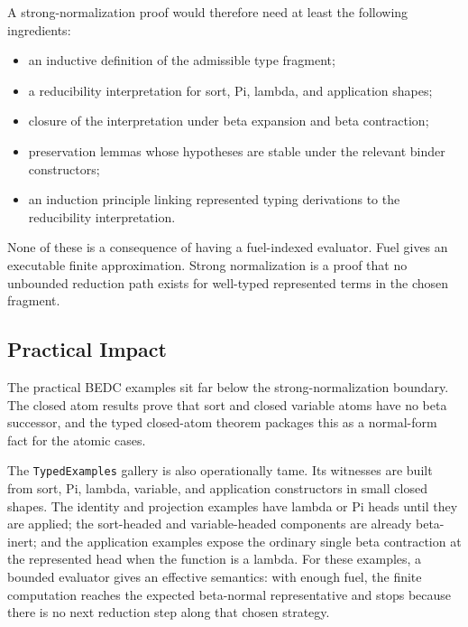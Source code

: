 A strong-normalization proof would therefore need at least the following
ingredients:

\begin{itemize}
  \item an inductive definition of the admissible type fragment;
  \item a reducibility interpretation for sort, Pi, lambda, and application
    shapes;
  \item closure of the interpretation under beta expansion and beta
    contraction;
  \item preservation lemmas whose hypotheses are stable under the relevant
    binder constructors;
  \item an induction principle linking represented typing derivations to the
    reducibility interpretation.
\end{itemize}

None of these is a consequence of having a fuel-indexed evaluator. Fuel gives
an executable finite approximation. Strong normalization is a proof that no
unbounded reduction path exists for well-typed represented terms in the
chosen fragment.

\subsection{Practical Impact}
\label{subsec:metacic-normalization-practical-impact}

The practical BEDC examples sit far below the strong-normalization boundary.
The closed atom results prove that sort and closed variable atoms have no beta
successor, and the typed closed-atom theorem packages this as a normal-form
fact for the atomic cases.


The \texttt{TypedExamples} gallery is also operationally tame. Its witnesses
are built from sort, Pi, lambda, variable, and application constructors in
small closed shapes. The identity and projection examples have lambda or Pi
heads until they are applied; the sort-headed and variable-headed components
are already beta-inert; and the application examples expose the ordinary
single beta contraction at the represented head when the function is a lambda.
For these examples, a bounded evaluator gives an effective semantics: with
enough fuel, the finite computation reaches the expected beta-normal
representative and stops because there is no next reduction step along that
chosen strategy.

